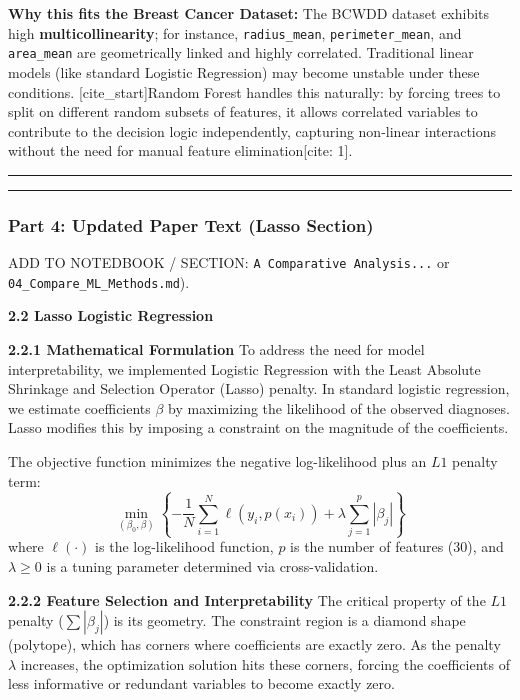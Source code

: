 \documentclass[
]{article}
\begin{document}
\textbf{Why this fits the Breast Cancer Dataset:} The BCWDD dataset
exhibits high \textbf{multicollinearity}; for instance,
\texttt{radius\_mean}, \texttt{perimeter\_mean}, and \texttt{area\_mean}
are geometrically linked and highly correlated. Traditional linear
models (like standard Logistic Regression) may become unstable under
these conditions. {[}cite\_start{]}Random Forest handles this naturally:
by forcing trees to split on different random subsets of features, it
allows correlated variables to contribute to the decision logic
independently, capturing non-linear interactions without the need for
manual feature elimination{[}cite: 1{]}.

\begin{center}\rule{0.5\linewidth}{0.5pt}\end{center}

\begin{center}\rule{0.5\linewidth}{0.5pt}\end{center}

\subsubsection{Part 4: Updated Paper Text (Lasso
Section)}\label{part-4-updated-paper-text-lasso-section}

ADD TO NOTEDBOOK / SECTION: \texttt{A\ Comparative\ Analysis...} or
\texttt{04\_Compare\_ML\_Methods.md}).

\textbf{2.2 Lasso Logistic Regression}

\textbf{2.2.1 Mathematical Formulation} To address the need for model
interpretability, we implemented Logistic Regression with the Least
Absolute Shrinkage and Selection Operator (Lasso) penalty. In standard
logistic regression, we estimate coefficients \(\beta\) by maximizing
the likelihood of the observed diagnoses. Lasso modifies this by
imposing a constraint on the magnitude of the coefficients.

The objective function minimizes the negative log-likelihood plus an
\(L1\) penalty term:
\[\min_{(\beta_0, \beta)} \left\{ - \frac{1}{N} \sum_{i=1}^{N} \ell(y_i, p(x_i)) + \lambda \sum_{j=1}^{p} |\beta_j| \right\}\]
where \(\ell(\cdot)\) is the log-likelihood function, \(p\) is the
number of features (30), and \(\lambda \geq 0\) is a tuning parameter
determined via cross-validation.

\textbf{2.2.2 Feature Selection and Interpretability} The critical
property of the \(L1\) penalty (\(\sum |\beta_j|\)) is its geometry. The
constraint region is a diamond shape (polytope), which has corners where
coefficients are exactly zero. As the penalty \(\lambda\) increases, the
optimization solution hits these corners, forcing the coefficients of
less informative or redundant variables to become exactly zero.
\end{document}
